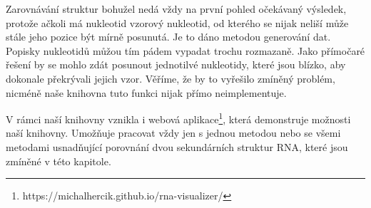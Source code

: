 Zarovnávání struktur bohužel nedá vždy na první pohled očekávaný výsledek,
protože ačkoli má nukleotid vzorový nukleotid, od kterého se nijak neliší může
stále jeho pozice být mírně posunutá. Je to dáno metodou generování dat.
Popisky nukleotidů můžou tím pádem vypadat trochu rozmazaně. Jako přímočaré
řešení by se mohlo zdát posunout jednotilvé nukleotidy, které jsou blízko, aby
dokonale překrývali jejich vzor. Věříme, že by to vyřešilo zmíněný problém,
nicméně naše knihovna tuto funkci nijak přímo neimplementuje.

V rámci naší knihovny vznikla i webová
aplikace\footnote{https://michalhercik.github.io/rna-visualizer/}, která
demonstruje možnosti naší knihovny. Umožňuje pracovat vždy jen s jednou metodou
nebo se všemi metodami usnadňující porovnání dvou sekundárních struktur RNA,
které jsou zmíněné v této kapitole.

